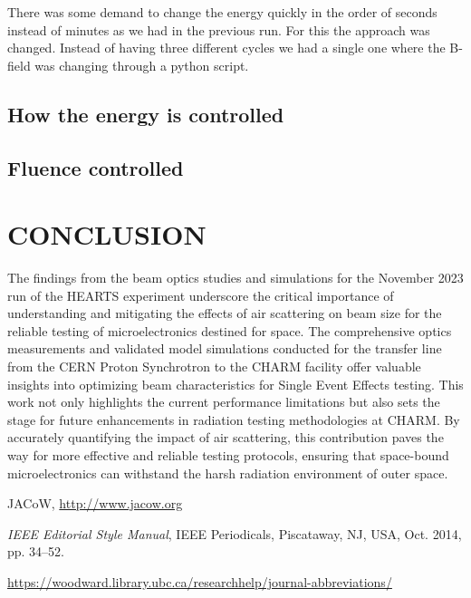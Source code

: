 \documentclass[a4paper,
               ]{jacow}
\begin{document}
There was some demand to change the energy quickly in the order of seconds instead of minutes as we had in the previous run. For this the approach was changed. Instead of having three different cycles we had a single one where the B-field was changing through a python script.

\subsection{How the energy is controlled}
\subsection{Fluence controlled}


\section{CONCLUSION}

The findings from the beam optics studies and simulations for the November 2023 run of the HEARTS experiment underscore the critical importance of understanding and mitigating the effects of air scattering on beam size for the reliable testing of microelectronics destined for space. The comprehensive optics measurements and validated model simulations conducted for the transfer line from the CERN Proton Synchrotron to the CHARM facility offer valuable insights into optimizing beam characteristics for Single Event Effects testing. This work not only highlights the current performance limitations but also sets the stage for future enhancements in radiation testing methodologies at CHARM. By accurately quantifying the impact of air scattering, this contribution paves the way for more effective and reliable testing protocols, ensuring that space-bound microelectronics can withstand the harsh radiation environment of outer space.

%
%
%
	{\printbibliography}%
	{%
	
	\begin{thebibliography}{9} %
	
		JACoW,
		\url{http://www.jacow.org}
	
		\textit{IEEE Editorial Style Manual},
		IEEE Periodicals, Piscataway,
		NJ, USA, Oct. 2014, pp. 34--52.

	\url{https://woodward.library.ubc.ca/researchhelp/journal-abbreviations/}

	\end{thebibliography}
} %
\end{document}
